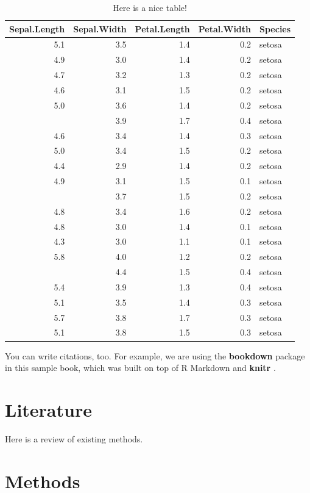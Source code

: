\documentclass[
]{book}
\begin{document}
\begin{table}

\caption{\label{tab:nice-tab}Here is a nice table!}
\centering
\begin{tabular}[t]{rrrrl}
\toprule
Sepal.Length & Sepal.Width & Petal.Length & Petal.Width & Species\\
\midrule
5.1 & 3.5 & 1.4 & 0.2 & setosa\\
4.9 & 3.0 & 1.4 & 0.2 & setosa\\
4.7 & 3.2 & 1.3 & 0.2 & setosa\\
4.6 & 3.1 & 1.5 & 0.2 & setosa\\
5.0 & 3.6 & 1.4 & 0.2 & setosa\\
\addlinespace
5.4 & 3.9 & 1.7 & 0.4 & setosa\\
4.6 & 3.4 & 1.4 & 0.3 & setosa\\
5.0 & 3.4 & 1.5 & 0.2 & setosa\\
4.4 & 2.9 & 1.4 & 0.2 & setosa\\
4.9 & 3.1 & 1.5 & 0.1 & setosa\\
\addlinespace
5.4 & 3.7 & 1.5 & 0.2 & setosa\\
4.8 & 3.4 & 1.6 & 0.2 & setosa\\
4.8 & 3.0 & 1.4 & 0.1 & setosa\\
4.3 & 3.0 & 1.1 & 0.1 & setosa\\
5.8 & 4.0 & 1.2 & 0.2 & setosa\\
\addlinespace
5.7 & 4.4 & 1.5 & 0.4 & setosa\\
5.4 & 3.9 & 1.3 & 0.4 & setosa\\
5.1 & 3.5 & 1.4 & 0.3 & setosa\\
5.7 & 3.8 & 1.7 & 0.3 & setosa\\
5.1 & 3.8 & 1.5 & 0.3 & setosa\\
\bottomrule
\end{tabular}
\end{table}

You can write citations, too. For example, we are using the \textbf{bookdown} package \citep{R-bookdown} in this sample book, which was built on top of R Markdown and \textbf{knitr} \citep{xie2015}.

\chapter{Literature}\label{literature}

Here is a review of existing methods.

\chapter{Methods}\label{methods}
\end{document}
